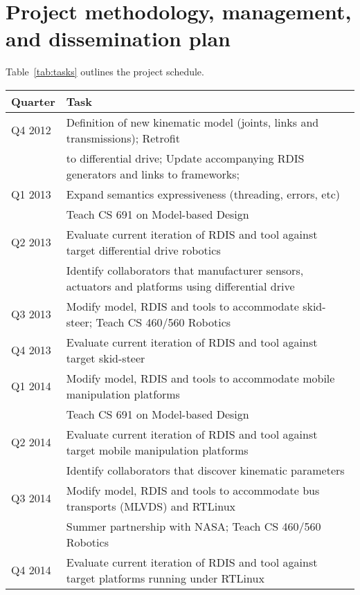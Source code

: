 
\section{Project methodology, management, and dissemination plan}
Table~\ref{tab:tasks} outlines the project schedule.
%
\begin{table}[htbp]
   \centering
   \begin{tabular}{|l|l|} 
   \hline
      {\bf Quarter}    & {\bf Task} \\
      \hline
      Q4 2012       &  Definition of new kinematic model (joints, links and transmissions); Retrofit\\
      			&to differential drive; Update accompanying RDIS generators and links to frameworks;  \\
      Q1 2013       &Expand semantics expressiveness (threading, errors, etc)\\
						&Teach CS 691 on Model-based Design\\
      Q2 2013       & Evaluate current iteration of RDIS and tool against target differential drive robotics\\
     			&Identify collaborators that manufacturer sensors, actuators and platforms using differential drive\\
       Q3 2013	&Modify model, RDIS and tools to accommodate skid-steer; Teach CS 460/560 Robotics\\
      Q4 2013       &Evaluate current iteration of RDIS and tool against target skid-steer \\
      Q1 2014       &Modify model, RDIS and tools to accommodate mobile manipulation platforms \\
						&Teach CS 691 on Model-based Design\\
      Q2 2014       &Evaluate current iteration of RDIS and tool against target mobile manipulation platforms \\
      			&Identify collaborators that discover kinematic parameters\\
      Q3 2014       & Modify model, RDIS and tools to accommodate bus transports (MLVDS) and RTLinux\\
      			&Summer partnership with NASA; Teach CS 460/560 Robotics\\
      Q4 2014       &Evaluate current iteration of RDIS and tool against target platforms running under RTLinux\\

\end{tabular}
\end{table}

